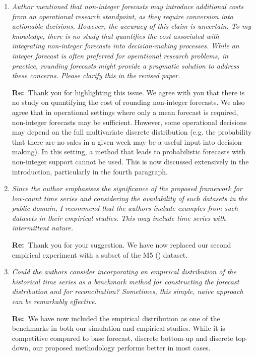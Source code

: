 \documentclass[11pt,a4paper]{article}
\newcommand{\RE}[2][Re:~]{{\color{blue}\textbf{#1}#2}}
\begin{document}
\begin{enumerate}
  \item \textit{Author mentioned that non-integer forecasts may introduce additional costs from an operational research standpoint, as they require conversion into actionable decisions. However, the accuracy of this claim is uncertain. To my knowledge, there is no study that quantifies the cost associated with integrating non-integer forecasts into decision-making processes. While an integer forecast is often preferred for operational research problems, in practice, rounding forecasts might provide a pragmatic solution to address these concerns. Please clarify this in the revised paper.}
  
  \RE{Thank you for highlighting this issue. We agree with you that there is no study on quantifying the cost of rounding non-integer forecasts. We also agree that in operational settings where only a mean forecast is required, non-integer forecasts may be sufficient. However, some operational decisions may depend on the full multivariate discrete distribution (e.g. the probability that there are no sales in a given week may be a useful input into decision-making). In this setting, a method that leads to probabilistic forecasts with non-integer support cannot be used. This is now discussed extensively in the introduction, particularly in the fourth paragraph.}

  \item \textit{Since the author emphasises the significance of the proposed framework for low-count time series and considering the availability of such datasets in the public domain, I recommend that the authors include examples from such datasets in their empirical studies. This may include time series with intermittent nature.}
  
  \RE{Thank you for your suggestion. We have now replaced our second empirical experiment with a subset of the M5 (\citealp{makridakisM5AccuracyCompetition2022}) dataset.}

  \item \textit{Could the authors consider incorporating an empirical distribution of the historical time series as a benchmark method for constructing the forecast distribution and for reconciliation? Sometimes, this simple, naive approach can be remarkably effective.}
  
  \RE{We have now included the empirical distribution as one of the benchmarks in both our simulation and empirical studies. While it is competitive compared to base forecast, discrete bottom-up and discrete top-down, our proposed methodology performs better in most cases.}
  

\end{enumerate}
\end{document}
